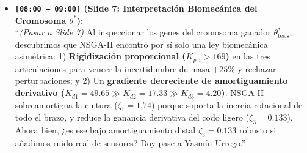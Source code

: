 \documentclass[11pt,a4paper]{article}
\begin{document}
\begin{itemize}
    \item \textbf{\texttt{[08:00 -- 09:00]} (Slide 7: Interpretación Biomecánica del Cromosoma $\theta^*$):} \\
    ``\textit{(Pasar a Slide 7)} Al inspeccionar los genes del cromosoma ganador $\theta^*_{\text{tesis}}$, descubrimos que NSGA-II encontró por sí solo una ley biomecánica asimétrica: 1) \textbf{Rigidización proporcional ($K_{p,i} > 169$)} en las tres articulaciones para vencer la incertidumbre de masa $+25\%$ y rechazar perturbaciones; y 2) Un \textbf{gradiente decreciente de amortiguamiento derivativo ($K_{d1} = 49.65 \gg K_{d2} = 17.33 \gg K_{d3} = 4.20$)}. NSGA-II sobreamortigua la cintura ($\zeta_1 = 1.74$) porque soporta la inercia rotacional de todo el brazo, y reduce la ganancia derivativa del codo ligero ($\zeta_3 = 0.133$). Ahora bien, ¿es ese bajo amortiguamiento distal $\zeta_3 = 0.133$ robusto si añadimos ruido real de sensores? Doy pase a Yasmín Urrego.''
\end{itemize}

\end{document}
